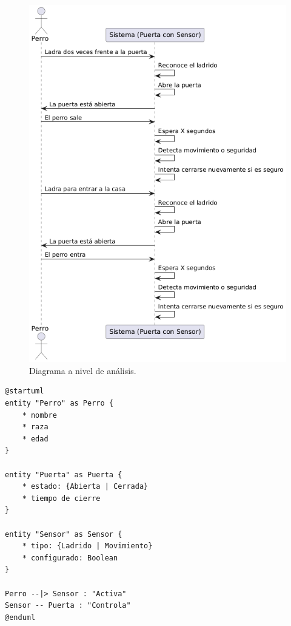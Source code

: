 \begin{figure}[!h]
\centering
\includegraphics[scale=0.5]{Pictures/pp_analisis.png}
\caption{Diagrama a nivel de análisis.}
\label{fig:diag-sec}
\end{figure}

\begin{tcolorbox}[colback=gray!5!white,colframe=orange!60!gray,title=Modelo de Dominio en PlantUML]
\begin{verbatim}
@startuml
entity "Perro" as Perro {
    * nombre
    * raza
    * edad
}

entity "Puerta" as Puerta {
    * estado: {Abierta | Cerrada}
    * tiempo de cierre
}

entity "Sensor" as Sensor {
    * tipo: {Ladrido | Movimiento}
    * configurado: Boolean
}

Perro --|> Sensor : "Activa"
Sensor -- Puerta : "Controla"
@enduml
\end{verbatim}
\end{tcolorbox}

